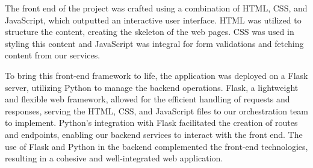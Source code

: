 The front end of the project was crafted using a combination of HTML, CSS, and JavaScript, which outputted an interactive user interface. HTML was utilized to structure the content, creating the skeleton of the web pages. CSS was used in styling this content and JavaScript was integral for form validations and fetching content from our services.

To bring this front-end framework to life, the application was deployed on a Flask server, utilizing Python to manage the backend operations. Flask, a lightweight and flexible web framework, allowed for the efficient handling of requests and responses, serving the HTML, CSS, and JavaScript files to our orchestration team to implement. Python's integration with Flask facilitated the creation of routes and endpoints, enabling our backend services to interact with the front end. The use of Flask and Python in the backend complemented the front-end technologies, resulting in a cohesive and well-integrated web application.